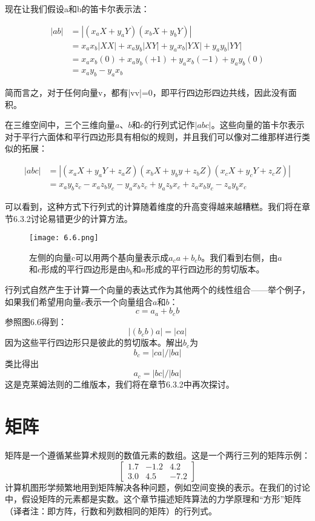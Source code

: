 \documentclass[lang=cn,12pt]{elegantbook}
\begin{document}
现在让我们假设a和b的笛卡尔表示法：

\begin{align}
  |ab| & = |(x_aX + y_aY)(x_bX + y_bY)| \nonumber               \\
       & =x_ax_b|XX|+x_ay_b|XY|+y_ax_b|YX|+y_ay_b|YY| \nonumber \\
       & =x_ax_b(0)+x_ay_b(+1)+y_ax_b(-1)+y_ay_b(0) \nonumber   \\
       & = x_a y_b - y_a x_b \nonumber
\end{align}

简而言之，对于任何向量v，都有|vv|=0，即平行四边形四边共线，因此没有面积。

在三维空间中，三个三维向量$a$、$b$和$c$的行列式记作$|abc|$。这些向量的笛卡尔表示对于平行六面体和平行四边形具有相似的规则，并且我们可以像对二维那样进行类似的拓展：

\begin{align}
  |abc| & = |(x_aX+y_aY+z_aZ)(x_bX+y_by+z_bZ)(x_cX+y_cY+z_cZ)| \nonumber         \\
        & =x_ay_bz_c-x_az_by_c-y_ax_bz_c+y_az_bx_c+z_ax_by_c-z_ay_bx_c \nonumber
\end{align}

可以看到，这种方式下行列式的计算随着维度的升高变得越来越糟糕。我们将在章节6.3.2讨论易错更少的计算方法。


\begin{figure}[htbp]
  \centering
  \texttt{[image: 6.6.png]}
  \caption{左侧的向量c可以用两个基向量表示成$a_ca+b_cb$。我们看到右侧，由$a$和$c$形成的平行四边形是由$b_b$和$a$形成的平行四边形的剪切版本。}
\end{figure}

行列式自然产生于计算一个向量的表达式作为其他两个的线性组合——举个例子，如果我们希望用向量$c$表示一个向量组合$a$和$b$：$$c = a_a + b_cb$$参照图6.6得到：$$|(b_cb)a| = |ca|$$因为这些平行四边形只是彼此的剪切版本。解出$b_c$为$$b_c = |ca|/|ba|$$类比得出$$a_c = |bc|/|ba|$$这是克莱姆法则的二维版本，我们将在章节6.3.2中再次探讨。

\section{矩阵}

矩阵是一个遵循某些算术规则的数值元素的数组。这是一个两行三列的矩阵示例：
$$
  \left[\begin{array}{rrr}
      1.7 & -1.2 & 4.2  \\
      3.0 & 4.5  & -7.2
    \end{array}\right]
$$
计算机图形学频繁地用到矩阵解决各种问题，例如空间变换的表示。在我们的讨论中，假设矩阵的元素都是实数。这个章节描述矩阵算法的力学原理和“方形”矩阵（译者注：即方阵，行数和列数相同的矩阵）的行列式。
\end{document}
